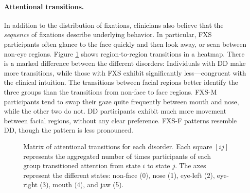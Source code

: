 \documentclass{llncs}
\begin{document}

  \paragraph{Attentional transitions.} In addition to the distribution of fixations, clinicians also believe that the \emph{sequence} of fixations describe underlying behavior. In particular, FXS participants often glance to the face quickly and then look away, or scan between non-eye regions. Figure \ref{fig:transitions} shows region-to-region transitions in a heatmap. There is a marked difference between the different disorders: Individuals with DD make more transitions, while those with FXS exhibit significantly less---congruent with the clinical intuition. The transitions between facial regions better identify the three groups than the transitions from non-face to face regions. FXS-M participants tend to swap their gaze quite frequently between mouth and nose, while the other two do not. DD participants exhibit much more movement between facial regions, without any clear preference. FXS-F patterns resemble DD, though the pattern is less pronounced.

  \begin{figure}[b]
    \hfill
    \hfill
    \caption{Matrix of attentional transitions for each disorder. Each square $[ij]$ represents the aggregated number of times participants of each group transitioned attention from state $i$ to state $j$.  The axes represent the different states: non-face (0), nose (1), eye-left (2), eye-right (3), mouth (4), and jaw (5).}
    \label{fig:transitions}
  \end{figure}
\end{document}
